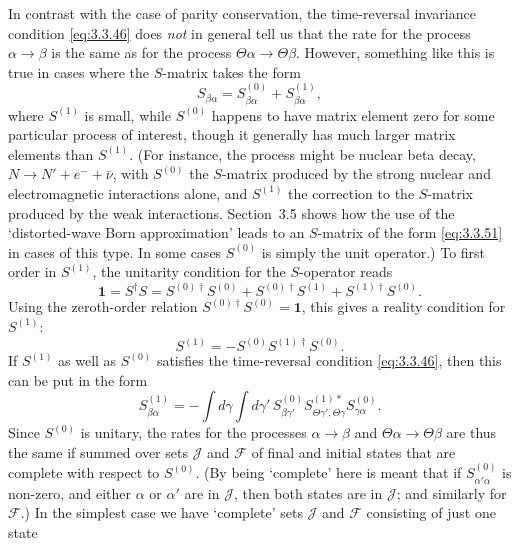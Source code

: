 In contrast with the case of parity conservation, the time-reversal invariance
condition \eqref{eq:3.3.46} does \textit{not} in general tell us that the rate for the
process $\alpha\to\beta$ is the same as for the process
$\Theta\alpha\to\Theta\beta$. However, something like this is true in cases where
the $S$-matrix takes the form
\begin{equation}
S_{\beta\alpha}=S^{(0)}_{\beta\alpha}+S^{(1)}_{\beta\alpha},
\tag{3.3.51}\label{eq:3.3.51}
\end{equation}
where $S^{(1)}$ is small, while $S^{(0)}$ happens to have matrix element zero for
some particular process of interest, though it generally has much larger matrix
elements than $S^{(1)}$. (For instance, the process might be nuclear beta decay,
$N\to N'+e^-+\bar\nu$, with $S^{(0)}$ the $S$-matrix produced by the strong nuclear
and electromagnetic interactions alone, and $S^{(1)}$ the correction to the
$S$-matrix produced by the weak interactions. Section~3.5 shows how the use of the
`distorted-wave Born approximation' leads to an $S$-matrix of the form \eqref{eq:3.3.51} in
cases of this type. In some cases $S^{(0)}$ is simply the unit operator.) To first
order in $S^{(1)}$, the unitarity condition for the $S$-operator reads
\[
\mathbf{1}=S^\dagger S
=S^{(0)\dagger}S^{(0)}+S^{(0)\dagger}S^{(1)}+S^{(1)\dagger}S^{(0)}.
\]
Using the zeroth-order relation $S^{(0)\dagger}S^{(0)}=\mathbf{1}$, this gives a
reality condition for $S^{(1)}$:
\begin{equation}
S^{(1)}=-S^{(0)}S^{(1)\dagger}S^{(0)}.
\tag{3.3.52}\label{eq:3.3.52}
\end{equation}
If $S^{(1)}$ as well as $S^{(0)}$ satisfies the time-reversal condition \eqref{eq:3.3.46},
then this can be put in the form
\begin{equation}
S^{(1)}_{\beta\alpha}=-\int d\gamma\int d\gamma'\,
S^{(0)}_{\beta\gamma'}S^{(1)*}_{\Theta\gamma',\Theta\gamma}
S^{(0)}_{\gamma\alpha}.
\tag{3.3.53}\label{eq:3.3.53}
\end{equation}
Since $S^{(0)}$ is unitary, the rates for the processes $\alpha\to\beta$ and
$\Theta\alpha\to\Theta\beta$ are thus the same if summed over sets $\mathcal{J}$
and $\mathcal{F}$ of final and initial states that are complete with respect to
$S^{(0)}$. (By being `complete' here is meant that if $S^{(0)}_{\alpha'\alpha}$ is
non-zero, and either $\alpha$ or $\alpha'$ are in $\mathcal{J}$, then both states
are in $\mathcal{J}$; and similarly for $\mathcal{F}$.) In the simplest case we
have `complete' sets $\mathcal{J}$ and $\mathcal{F}$ consisting of just one state

